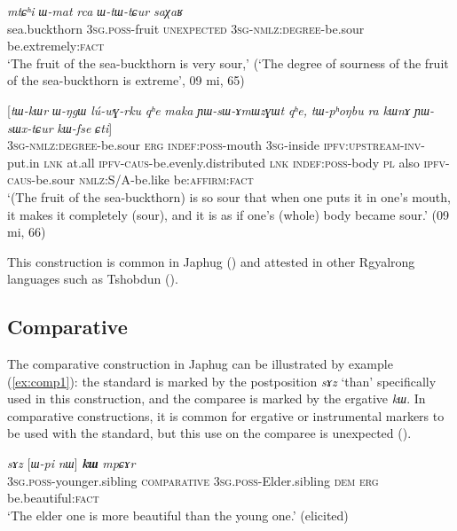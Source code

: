 \documentclass[oneside,a4paper,12pt]{article}
\newcommand{\ipa}[1]{{\phon\textit{#1}}}
\begin{document}
\begin{exe}
\ex \label{ex:WtWCur}
\gll 
\ipa{mtɕʰi}  	\ipa{ɯ-mat}  	\ipa{rca}  	\ipa{ɯ-tɯ-tɕur}  	\ipa{saχaʁ}  	   \\
sea.buckthorn \textsc{3sg.poss}-fruit \textsc{unexpected} \textsc{3sg-nmlz:degree}-be.sour be.extremely:\textsc{fact}   \\
\glt `The fruit of the sea-buckthorn is very sour,' (`The degree of sourness of the fruit of the sea-buckthorn is extreme', 09 mi, 65)
\end{exe}

\begin{exe}
\ex \label{ex:YWsWxtCur}
\gll 
 	[\ipa{ɯ-tɯ-tɕur}]  	\ipa{\textbf{kɯ}}  	[\ipa{tɯ-kɯr}  	\ipa{ɯ-ŋgɯ}  	\ipa{lú-wɣ-rku}  	\ipa{qʰe}  	\ipa{maka}  	\ipa{ɲɯ-sɯ-ɤmɯzɣɯt}  	\ipa{qʰe,}  	\ipa{tɯ-pʰoŋbu}  	\ipa{ra}  	\ipa{kɯnɤ}  	\ipa{ɲɯ-sɯx-tɕur}  	\ipa{kɯ-fse}  	\ipa{ɕti}]  \\
  \textsc{3sg-nmlz:degree}-be.sour \textsc{erg} \textsc{indef:poss}-mouth \textsc{3sg}-inside \textsc{ipfv:upstream-inv}-put.in \textsc{lnk} at.all \textsc{ipfv-caus}-be.evenly.distributed \textsc{lnk} \textsc{indef:poss}-body \textsc{pl} also \textsc{ipfv-caus}-be.sour \textsc{nmlz:S/A}-be.like be:\textsc{affirm}:\textsc{fact} \\
\glt `(The fruit of the sea-buckthorn) is so sour that when one puts it in one's mouth, it makes it completely (sour), and it is as if one's (whole) body became sour.' (09 mi, 66)
\end{exe}

This construction is common in Japhug (\citealt[8]{jacques16comparative}) and attested in other Rgyalrong languages such as Tshobdun (\citealt[911]{jackson06guanxiju}).

\subsection{Comparative}
The comparative construction in Japhug can be illustrated by example (\ref{ex:comp1}): the  standard is marked by the postposition \ipa{sɤz} `than' specifically used in this construction, and the comparee is marked by the ergative  \ipa{kɯ}. In comparative constructions, it is common for ergative or instrumental markers to be used with the standard, but this use on the comparee is unexpected (\citealt{jacques16comparative}).

\begin{exe}
\ex \label{ex:comp1}
\gll  \ipa{ɯ-ʁi}   	\ipa{sɤz}   	[\ipa{ɯ-pi}   	\ipa{nɯ}]   	\ipa{\textbf{kɯ}}   	\ipa{mpɕɤr}     \\
\textsc{3sg.poss}-younger.sibling \textsc{comparative} \textsc{3sg.poss}-Elder.sibling \textsc{dem} \textsc{erg}  be.beautiful:\textsc{fact} \\
\glt `The elder one is more beautiful than the young one.' (elicited)
\end{exe}
\end{document}

